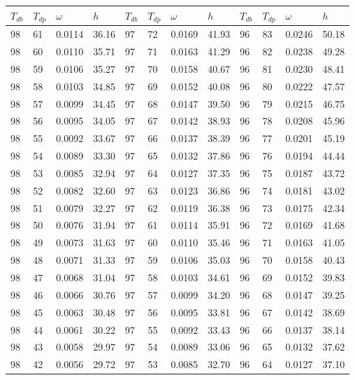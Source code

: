 \begin{tabular}{llll|llll|llll}
 \toprule 
\(T_{db}\) & \(T_{dp}\) & \(\omega\) & \(h\) & \(T_{db}\) & \(T_{dp}\) & \(\omega\) & \(h\) & \(T_{db}\) & \(T_{dp}\) & \(\omega\) & \(h\)  \\ \midrule 
98 & 61 & 0.0114 & 36.16 & 97 & 72 & 0.0169 & 41.93 & 96 & 83 & 0.0246 & 50.18\\
98 & 60 & 0.0110 & 35.71 & 97 & 71 & 0.0163 & 41.29 & 96 & 82 & 0.0238 & 49.28\\
98 & 59 & 0.0106 & 35.27 & 97 & 70 & 0.0158 & 40.67 & 96 & 81 & 0.0230 & 48.41\\
98 & 58 & 0.0103 & 34.85 & 97 & 69 & 0.0152 & 40.08 & 96 & 80 & 0.0222 & 47.57\\
98 & 57 & 0.0099 & 34.45 & 97 & 68 & 0.0147 & 39.50 & 96 & 79 & 0.0215 & 46.75\\
98 & 56 & 0.0095 & 34.05 & 97 & 67 & 0.0142 & 38.93 & 96 & 78 & 0.0208 & 45.96\\
98 & 55 & 0.0092 & 33.67 & 97 & 66 & 0.0137 & 38.39 & 96 & 77 & 0.0201 & 45.19\\
98 & 54 & 0.0089 & 33.30 & 97 & 65 & 0.0132 & 37.86 & 96 & 76 & 0.0194 & 44.44\\
98 & 53 & 0.0085 & 32.94 & 97 & 64 & 0.0127 & 37.35 & 96 & 75 & 0.0187 & 43.72\\
98 & 52 & 0.0082 & 32.60 & 97 & 63 & 0.0123 & 36.86 & 96 & 74 & 0.0181 & 43.02\\
98 & 51 & 0.0079 & 32.27 & 97 & 62 & 0.0119 & 36.38 & 96 & 73 & 0.0175 & 42.34\\
98 & 50 & 0.0076 & 31.94 & 97 & 61 & 0.0114 & 35.91 & 96 & 72 & 0.0169 & 41.68\\
98 & 49 & 0.0073 & 31.63 & 97 & 60 & 0.0110 & 35.46 & 96 & 71 & 0.0163 & 41.05\\
98 & 48 & 0.0071 & 31.33 & 97 & 59 & 0.0106 & 35.03 & 96 & 70 & 0.0158 & 40.43\\
98 & 47 & 0.0068 & 31.04 & 97 & 58 & 0.0103 & 34.61 & 96 & 69 & 0.0152 & 39.83\\
98 & 46 & 0.0066 & 30.76 & 97 & 57 & 0.0099 & 34.20 & 96 & 68 & 0.0147 & 39.25\\
98 & 45 & 0.0063 & 30.48 & 97 & 56 & 0.0095 & 33.81 & 96 & 67 & 0.0142 & 38.69\\
98 & 44 & 0.0061 & 30.22 & 97 & 55 & 0.0092 & 33.43 & 96 & 66 & 0.0137 & 38.14\\
98 & 43 & 0.0058 & 29.97 & 97 & 54 & 0.0089 & 33.06 & 96 & 65 & 0.0132 & 37.62\\
98 & 42 & 0.0056 & 29.72 & 97 & 53 & 0.0085 & 32.70 & 96 & 64 & 0.0127 & 37.10\\

\end{tabular}
